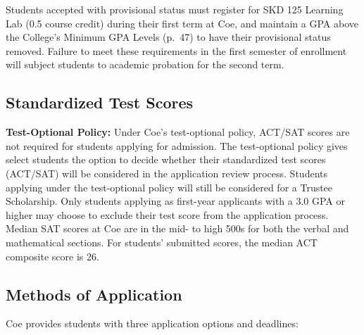 \documentclass[
  letterpaper,
]{scrbook}
\begin{document}
Students accepted with provisional status must register for SKD 125
Learning Lab (0.5 course credit) during their first term at Coe, and
maintain a GPA above the College's Minimum GPA Levels (p.~47) to have
their provisional status removed. Failure to meet these requirements in
the first semester of enrollment will subject students to academic
probation for the second term.

\subsection{Standardized Test Scores}\label{standardized-test-scores}

\textbf{Test-Optional Policy:} Under Coe's test-optional policy, ACT/SAT
scores are not required for students applying for admission. The
test-optional policy gives select students the option to decide whether
their standardized test scores (ACT/SAT) will be considered in the
application review process. Students applying under the test-optional
policy will still be considered for a Trustee Scholarship. Only students
applying as first-year applicants with a 3.0 GPA or higher may choose to
exclude their test score from the application process. Median SAT scores
at Coe are in the mid- to high 500s for both the verbal and mathematical
sections. For students' submitted scores, the median ACT composite score
is 26.

\subsection{Methods of Application}\label{methods-of-application}

Coe provides students with three application options and deadlines:
\end{document}
